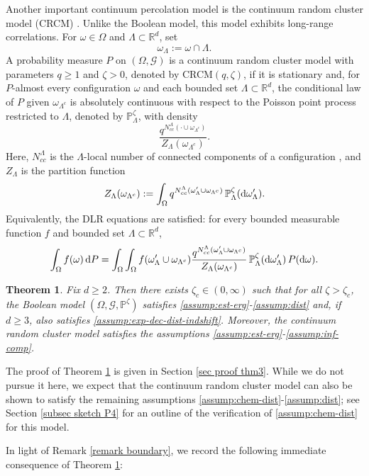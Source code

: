\documentclass[11pt]{article}
\renewcommand{\d}{{\rm d}}
\newcommand{\R}{\mathbb R}
\renewcommand{\P}{\mathbb P}
\newtheorem{theorem}{Theorem}[section]
\theoremstyle{rem}
\begin{document}
Another important continuum percolation model is the continuum random cluster model (CRCM) \cite{DH15,H18}. Unlike the Boolean model, this model exhibits long-range correlations. For $\omega\in\Omega$ and $\Lambda\subset\R^d$, set
\[
\omega_\Lambda:=\omega\cap\Lambda.
\]
A probability measure $P$ on $(\Omega,\mathcal G)$ is a continuum random cluster model with parameters $q\geq1$ and $\zeta>0$, denoted by CRCM$(q,\zeta)$, if it is stationary and, for $P$-almost every configuration $\omega$ and each bounded set $\Lambda\subset\R^d$, the conditional law of $P$ given $\omega_{\Lambda^c}$ is absolutely continuous with respect to the Poisson point process restricted to $\Lambda$, denoted by $\P^\zeta_\Lambda$, with density
\[
\frac{
q^{N^\Lambda_{cc}(\cdot\cup\omega_{\Lambda^c})}
}{
Z_\Lambda(\omega_{\Lambda^c})
}.
\]
Here, $N^\Lambda_{cc}$ is the $\Lambda$-local number of connected components of a configuration \cite[Definition 2.1]{H18}, and $Z_\Lambda$ is the partition function
\[
Z_\Lambda(\omega_{\Lambda^c})
:=
\int_\Omega
q^{N^\Lambda_{cc}(\omega'_\Lambda\cup\omega_{\Lambda^c})}
\,\P^\zeta_\Lambda(\d\omega'_\Lambda).
\]
Equivalently, the DLR equations are satisfied: for every bounded measurable function $f$ and bounded set $\Lambda\subset\R^d$,
\[
\int_\Omega f(\omega)\,\d P
=
\int_\Omega\int_\Omega
f(\omega'_\Lambda\cup\omega_{\Lambda^c})
\frac{
q^{N^\Lambda_{cc}(\omega'_\Lambda\cup\omega_{\Lambda^c})}
}{
Z_\Lambda(\omega_{\Lambda^c})
}
\,\P^\zeta_\Lambda(\d\omega'_\Lambda)
\,P(\d\omega).
\]

\begin{theorem}\label{theorem 3}
Fix $d\geq2$. Then there exists $\zeta_c\in(0,\infty)$ such that for all
$\zeta>\zeta_c$, the Boolean model $(\Omega,\mathcal G,\P^\zeta)$ satisfies
\ref{assump:est-erg}-\ref{assump:dist} and, if $d\geq3$, also satisfies
\ref{assump:exp-dec-dist-indshift}. Moreover, the continuum random cluster model satisfies the assumptions \ref{assump:est-erg}-\ref{assump:inf-comp}.
\end{theorem}

The proof of Theorem \ref{theorem 3} is given in Section \ref{sec proof thm3}. While we do not pursue it here, we expect that the continuum random cluster model can also be shown to satisfy the remaining assumptions \ref{assump:chem-dist}-\ref{assump:dist}; see Section \ref{subsec sketch P4} for an outline of the verification of \ref{assump:chem-dist} for this model.

In light of Remark \ref{remark boundary}, we record the following immediate consequence of Theorem \ref{theorem 3}: 
\end{document}
